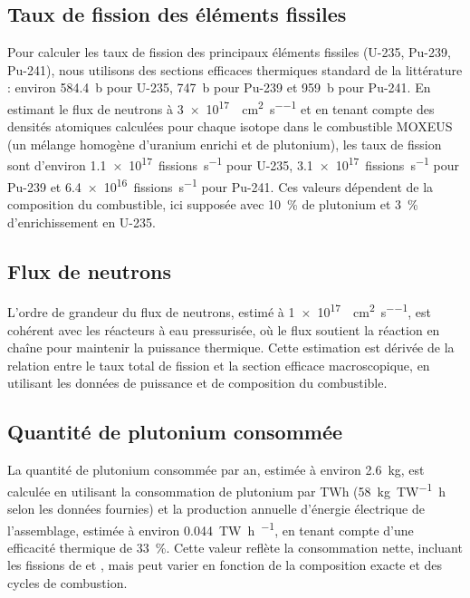 \subsection{Taux de fission des éléments fissiles}
Pour calculer les taux de fission des principaux éléments fissiles (U-235, Pu-239, Pu-241), nous utilisons des sections efficaces thermiques standard de la littérature : environ \SI{584,4}{\barn} pour U-235, \SI{747}{\barn} pour Pu-239 et \SI{959}{\barn} pour Pu-241. En estimant le flux de neutrons à \SI{3e17}{\neutron\per\centi\meter\squared\per\second} et en tenant compte des densités atomiques calculées pour chaque isotope dans le combustible MOXEUS (un mélange homogène d'uranium enrichi et de plutonium), les taux de fission sont d'environ \SI{1,1e17}{fissions\per\second} pour U-235, \SI{3,1e17}{fissions\per\second} pour Pu-239 et \SI{6,4e16}{fissions\per\second} pour Pu-241. Ces valeurs dépendent de la composition du combustible, ici supposée avec \SI{10}{\percent} de plutonium et \SI{3}{\percent} d'enrichissement en U-235.

\subsection{Flux de neutrons}
L'ordre de grandeur du flux de neutrons, estimé à \SI{1e17}{\neutron\per\centi\meter\squared\per\second}, est cohérent avec les réacteurs à eau pressurisée, où le flux soutient la réaction en chaîne pour maintenir la puissance thermique. Cette estimation est dérivée de la relation entre le taux total de fission et la section efficace macroscopique, en utilisant les données de puissance et de composition du combustible.

\subsection{Quantité de plutonium consommée}
La quantité de plutonium consommée par an, estimée à environ \SI{2,6}{\kilogram}, est calculée en utilisant la consommation de plutonium par TWh (\SI{58}{\kilogram\per\tera\watt\hour} selon les données fournies) et la production annuelle d'énergie électrique de l'assemblage, estimée à environ \SI{0,044}{\tera\watt\hour\per\year}, en tenant compte d'une efficacité thermique de \SI{33}{\percent}. Cette valeur reflète la consommation nette, incluant les fissions de  et , mais peut varier en fonction de la composition exacte et des cycles de combustion.